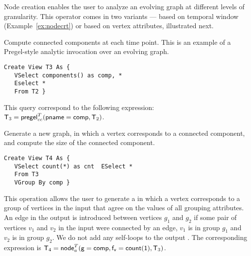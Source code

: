 Node creation enables the user to analyze an evolving graph at
different levels of granularity.  This operator comes in two variants
--- based on temporal window (Example~\ref{ex:nodecrt}) or based
on vertex attributes, illustrated next.

\begin{example}
\label{ex:cc}

Compute connected components at each time point.  This is an
  example of a Pregel-style analytic invocation over an evolving
  graph.

\begin{small} 
\begin{verbatim}
Create View T3 As { 
   VSelect components() as comp, *
   Eselect *
   From T2 }
\end{verbatim}
\end{small}

This query correspond to the following \tra expression:
$\mathsf{T}_3 = \textsf{pregel}^T_{cc} (\mathsf{pname=comp}, \mathsf{T}_2)$.

\end{example}



\begin{example}
\label{ex:nodecra}

Generate a new graph, in which a vertex corresponds to a connected
component, and compute the size of the connected component.  

\begin{small} 
\begin{verbatim}
Create View T4 As { 
   VSelect count(*) as cnt  ESelect *
   From T3
   VGroup By comp }
\end{verbatim}
\end{small}

\end{example}

This operation allows the user to generate a \tg in which a vertex
corresponds to a group of vertices in the input that agree on the
values of all grouping attributes.  An edge in the output is
introduced between vertices $g_1$ and $g_2$ if some pair of vertices
$v_1$ and $v_2$ in the input \tg were connected by an edge, $v_1$ is
in group $g_1$ and $v_2$ is in group $g_2$.  We do not add any
self-loops to the output \tg. The corresponding \tra expression is
$\mathsf{T}_4 = \textsf{node}^T_a(\mathsf{g=comp,f_v=count(1)},\mathsf{T}_3)$.

